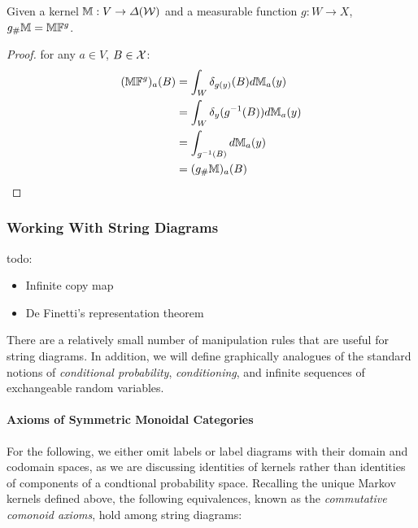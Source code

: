 \begin{lemma}\label{lem:pushf_funk}
Given a kernel $\mathbb{M}:V\to \Delta(\mathcal{W})$ and a measurable function $g:W\to X$, $g_\# \mathbb{M} = \mathbb{M} \mathbb{F}^{g}$.
\end{lemma}

\begin{proof}
for any $a\in V$, $B\in \mathcal{X}$:
\begin{align}
	(\mathbb{M}\mathbb{F}^g)_a(B) &= \int_W \delta_{g(y)}(B) d\mathbb{M}_a(y)\\
								&= \int_W \delta_{y}(g^{-1}(B)) d\mathbb{M}_a(y)\\
								&= \int_{g^{-1}(B)} d\mathbb{M}_a(y)\\
								&= (g_{\#} \mathbb{M})_a (B)
\end{align}
\end{proof}

\subsubsection{Working With String Diagrams}\label{sssec:string_diagram_manipulation}

todo:
\begin{itemize}
\item Infinite copy map
\item De Finetti's representation theorem
\end{itemize}

There are a relatively small number of manipulation rules that are useful for string diagrams. In addition, we will define graphically analogues of the standard notions of \emph{conditional probability}, \emph{conditioning}, and infinite sequences of exchangeable random variables.

\paragraph{Axioms of Symmetric Monoidal Categories}

For the following, we either omit labels or label diagrams with their domain and codomain spaces, as we are discussing identities of kernels rather than identities of components of a condtional probability space. Recalling the unique Markov kernels defined above, the following equivalences, known as the \emph{commutative comonoid axioms}, hold among string diagrams:

